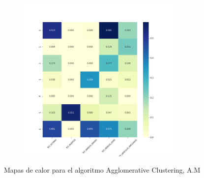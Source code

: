 \begin{figure}[H]
\begin{subfigure}{.5\textwidth}
\end{subfigure}
\begin{subfigure}{.5\textwidth}
  \centering
  \includegraphics[width=0.9\textwidth]{imagenes/case2/agglomerative/heatmaps/hm_agglomerative_case2_salida_k7.png}
\end{subfigure}
\caption{Mapas de calor para el algoritmo Agglomerative Clustering, A.M}
\label{fig:hm-km}
\end{figure}

